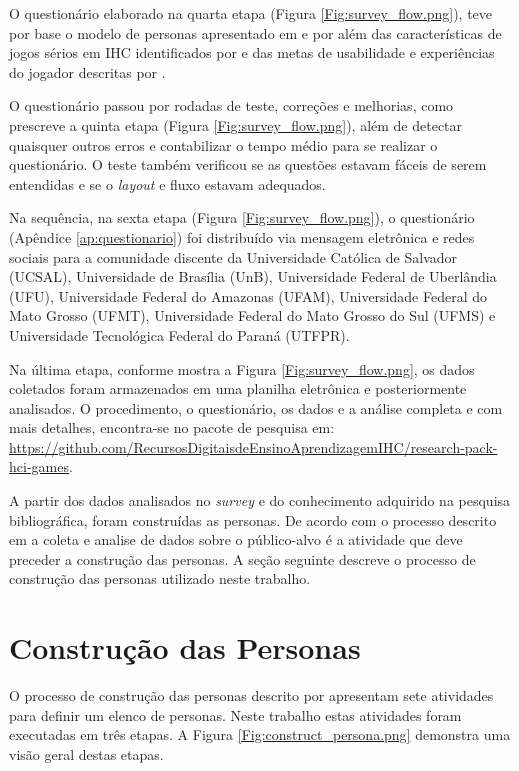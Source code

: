 O questionário elaborado na quarta etapa (Figura \ref{Fig:survey_flow.png}), teve por base o modelo de personas apresentado em \citeauthor{usability2020} e por  além das características de jogos sérios em IHC identificados por  e das metas de usabilidade e experiências do jogador descritas por . 

O questionário passou por rodadas de teste, correções e melhorias, como prescreve a quinta etapa (Figura \ref{Fig:survey_flow.png}), além de detectar quaisquer outros erros e contabilizar o tempo médio para se realizar o questionário. O teste também verificou se as questões estavam fáceis de serem entendidas e se o \textit{layout} e fluxo estavam adequados.

Na sequência, na sexta etapa (Figura \ref{Fig:survey_flow.png}), o questionário (Apêndice \ref{ap:questionario}) foi distribuído via mensagem eletrônica e redes sociais para a comunidade discente da Universidade Católica de Salvador (UCSAL), Universidade de Brasília (UnB), Universidade Federal de Uberlândia (UFU), Universidade Federal do Amazonas (UFAM),  Universidade Federal do Mato Grosso (UFMT), Universidade Federal do Mato Grosso do Sul (UFMS) e Universidade Tecnológica Federal do Paraná (UTFPR).

Na última etapa, conforme mostra a Figura \ref{Fig:survey_flow.png}, os dados coletados foram armazenados em uma planilha eletrônica e posteriormente analisados. O procedimento, o questionário, os dados e a análise completa e com mais detalhes, encontra-se no pacote de pesquisa em: \url{https://github.com/RecursosDigitaisdeEnsinoAprendizagemIHC/research-pack-hci-games}.

A partir dos dados analisados no \textit{survey} e do conhecimento adquirido na pesquisa bibliográfica, foram construídas as personas. De acordo com o processo descrito em \citeauthor{usability2020} a coleta e analise de dados sobre o público-alvo é a atividade que deve preceder a construção das personas. A seção seguinte descreve o processo de construção das personas utilizado neste trabalho.

\section{Construção das Personas}
\label{sec:const_person}

O processo de construção das personas descrito por  apresentam sete atividades para definir um elenco de personas. Neste trabalho estas atividades foram executadas em três etapas. A Figura \ref{Fig:construct_persona.png} demonstra uma visão geral destas etapas.

